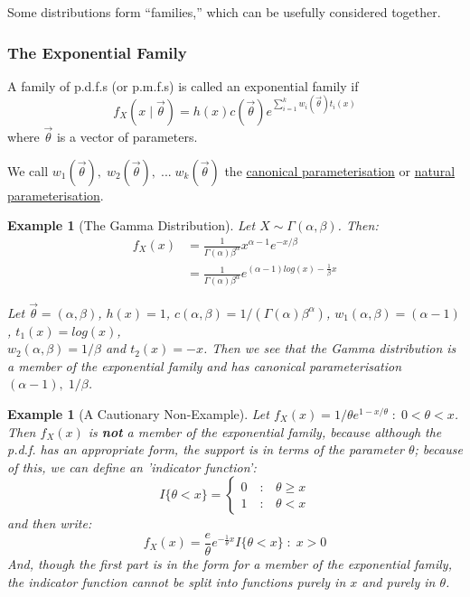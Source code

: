 \documentclass[12pt,a4paper]{article}
\newtheorem{ex}[thm]{Example}
\begin{document}
Some distributions form ``families,'' which can be usefully considered together.

\subsubsection{The Exponential Family}

A family of p.d.f.s (or p.m.f.s) is called an exponential family if
$$f_X(x\; | \; \vec{\theta}) = h(x) c(\vec{\theta}) e^{\sum\limits_{i=1}^k w_i(\vec{\theta}) t_i(x)}$$
where $\vec{\theta}$ is a vector of parameters.

We call $w_1(\vec{\theta}),\; w_2(\vec{\theta}),\; ...\; w_k(\vec{\theta})$ the \underline{canonical parameterisation} or \underline{natural parameterisation}.

\begin{ex}[The Gamma Distribution]
\vspace{1cm}

Let $X \sim \Gamma(\alpha, \beta)$. Then:
\begin{align*}
f_X(x) &= \frac{1}{\Gamma(\alpha) \beta^\alpha} x^{\alpha-1}e^{-x/\beta}\\
&= \frac{1}{\Gamma(\alpha)\beta^\alpha}e^{(\alpha-1)log(x) - \frac{1}{\beta}x}
\end{align*}

Let $\vec{\theta} = (\alpha,\beta)$, $h(x) = 1$, $c(\alpha,\beta) = 1/(\Gamma(\alpha)\beta^\alpha)$, $w_1(\alpha,\beta) = (\alpha-1)$, $t_1(x) = log(x)$,\\ $w_2(\alpha, \beta) = 1/\beta$ and $t_2(x) = -x$. Then we see that the Gamma distribution is a member of the exponential family and has canonical parameterisation $(\alpha-1),\; 1/\beta$.

\end{ex}

\begin{ex}[A Cautionary Non-Example]
\vspace{1cm}

Let $f_X(x) = 1/\theta e^{1-x/\theta}\; : \; 0<\theta<x$. Then $f_X(x)$ is \textbf{not} a member of the exponential family, because although the p.d.f. has an appropriate form, the support is in terms of the parameter $\theta$; because of this, we can define an 'indicator function':
$$I\{\theta<x\} = \left\{\begin{array}{cl} 0 \quad :& \theta \geq x\\ 1\quad :& \theta<x \end{array}\right.$$
and then write:
$$f_X(x) = \frac{e}{\theta}e^{-\frac{1}{\theta}x}I\{\theta < x\}\; : \; x>0$$
And, though the first part is in the form for a member of the exponential family, the indicator function cannot be split into functions purely in $x$ and purely in $\theta$.

\end{ex}
\end{document}
